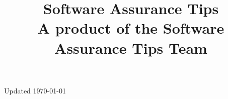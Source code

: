 \documentclass[letterpaper, 10pt]{article}
\author{\AuthorName}
\date{\ArticleDate}
\title{
	\textmd{\textbf{Software Assurance Tips}}\\
	\normalsize{A product of the Software Assurance Tips Team\autocite{swatips}}\\
}
\begin{document}
\maketitle
\clearpage
\section{\ArticleName}
\footnotesize{Updated \today}\normalsize{}


\clearpage
\printbibliography
\end{document}
